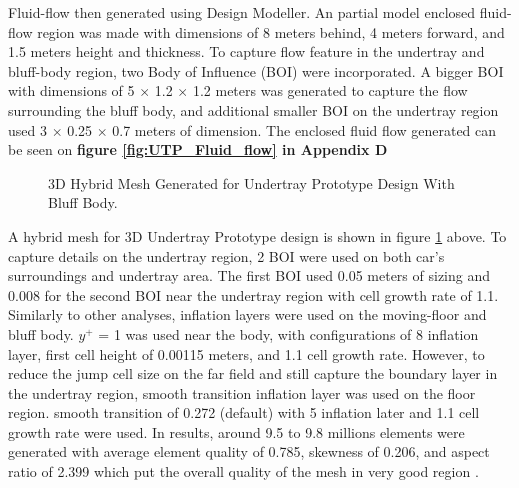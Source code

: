  \noindent Fluid-flow then generated using Design Modeller. An partial model enclosed fluid-flow region was made with dimensions of 8 meters behind, 4 meters forward, and 1.5 meters height and thickness. To capture flow feature in the undertray and bluff-body region, two Body of Influence (BOI) were incorporated. A bigger BOI with dimensions of 5 $\times$ 1.2 $\times$ 1.2 meters was generated to capture the flow surrounding the bluff body, and additional smaller BOI on the undertray region used 3 $\times$ 0.25 $\times$ 0.7 meters of dimension. The enclosed fluid flow generated can be seen on \textbf{figure \ref{fig:UTP_Fluid_flow} in Appendix D}
 
 \begin{figure}[!htb] 
    \centering
    \noindent{}
    \caption{3D Hybrid Mesh Generated for Undertray Prototype Design With Bluff Body.}
    \label{fig:3D_UT_MESH}
\end{figure}

\noindent A hybrid mesh for 3D Undertray Prototype design is shown in figure \ref{fig:3D_UT_MESH} above. To capture details on the undertray region, 2 BOI were used on both car's surroundings and undertray area. The first BOI used 0.05 meters of sizing and 0.008 for the second BOI near the undertray region with cell growth rate of 1.1. Similarly to other analyses, inflation layers were used on the moving-floor and bluff body. $y^+$ = 1 was used near the body, with configurations of 8 inflation layer, first cell height of 0.00115 meters, and 1.1 cell growth rate. However, to reduce the jump cell size on the far field and still capture the boundary layer in the undertray region, smooth transition inflation layer was used on the floor region. smooth transition of 0.272 (default) with 5 inflation later and 1.1 cell growth rate were used. In results, around 9.5 to 9.8 millions elements were generated with average element quality of 0.785, skewness of 0.206, and aspect ratio of 2.399 which put the overall quality of the mesh in very good region \cite{Ansys2006ModelingFlows}.   

